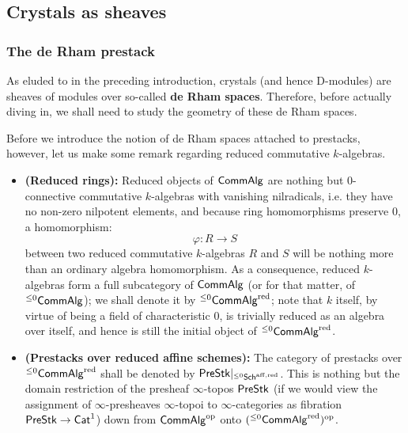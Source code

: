         \subsection{Crystals as sheaves}
            \subsubsection{The de Rham prestack}
                As eluded to in the preceding introduction, crystals (and hence D-modules) are sheaves of modules over so-called \textbf{de Rham spaces}. Therefore, before actually diving in, we shall need to study the geometry of these de Rham spaces.
            
                Before we introduce the notion of de Rham spaces attached to prestacks, however, let us make some remark regarding reduced commutative $k$-algebras. 
                \begin{remark} \label{remark: reduced_affine_schemes}
                    \noindent
                    \begin{itemize}
                        \item \textbf{(Reduced rings):} Reduced objects of $\mathsf{Comm}\mathsf{Alg}$ are nothing but $0$-connective commutative $k$-algebras with vanishing nilradicals, i.e. they have no non-zero nilpotent elements, and because ring homomorphisms preserve $0$, a homomorphism:
                            $$\varphi: R \to S$$
                        between two reduced commutative $k$-algebras $R$ and $S$ will be nothing more than an ordinary algebra homomorphism. As a consequence, reduced $k$-algebras form a full subcategory of $\mathsf{Comm}\mathsf{Alg}$ (or for that matter, of ${}^{\leq 0}\mathsf{Comm}\mathsf{Alg}$); we shall denote it by ${}^{\leq 0}\mathsf{Comm}\mathsf{Alg}^{\mathrm{red}}$; note that $k$ itself, by virtue of being a field of characteristic $0$, is trivially reduced as an algebra over itself, and hence is still the initial object of ${}^{\leq 0}\mathsf{Comm}\mathsf{Alg}^{\mathrm{red}}$. 
                        \item \textbf{(Prestacks over reduced affine schemes):} The category of prestacks over ${}^{\leq 0}\mathsf{Comm}\mathsf{Alg}^{\mathrm{red}}$ shall be denoted by $\mathsf{Pre}\mathsf{Stk}|_{{}^{\leq 0}\mathsf{Sch}^{\mathrm{aff}, \mathrm{red}}}$. This is nothing but the domain restriction of the presheaf $\infty$-topos $\mathsf{Pre}\mathsf{Stk}$ (if we would view the assignment of $\infty$-presheaves $\infty$-topoi to $\infty$-categories as fibration $\mathsf{Pre}\mathsf{Stk} \to \mathsf{Cat}^1$) down from $\mathsf{Comm}\mathsf{Alg}^{\mathrm{op}}$ onto $({}^{\leq 0}\mathsf{Comm}\mathsf{Alg}^{\mathrm{red}})^{\mathrm{op}}$. 
                    \end{itemize}
                \end{remark}
                
